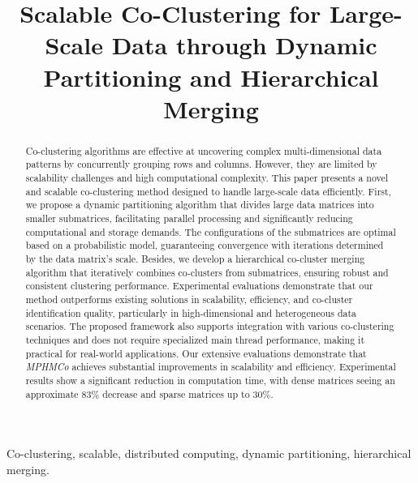 \documentclass[journal]{IEEEtran}
\begin{document}
\title{\LARGE \bf Scalable Co-Clustering for Large-Scale Data through Dynamic Partitioning and Hierarchical Merging}


\author{}
\maketitle

\begin{abstract}
  Co-clustering algorithms are effective at uncovering complex multi-dimensional data patterns by concurrently grouping rows and columns. However, they are limited by scalability challenges and high computational complexity. This paper presents a novel and scalable co-clustering method designed to handle large-scale data efficiently. First, we propose a dynamic partitioning algorithm that divides large data matrices into smaller submatrices, facilitating parallel processing and significantly reducing computational and storage demands. The configurations of the submatrices are optimal based on a probabilistic model, guaranteeing convergence with iterations determined by the data matrix's scale. Besides, we develop a hierarchical co-cluster merging algorithm that iteratively combines co-clusters from submatrices, ensuring robust and consistent clustering performance. Experimental evaluations demonstrate that our method outperforms existing solutions in scalability, efficiency, and co-cluster identification quality, particularly in high-dimensional and heterogeneous data scenarios. The proposed framework also supports integration with various co-clustering techniques and does not require specialized main thread performance, making it practical for real-world applications. Our extensive evaluations demonstrate that \emph{MPHMCo} achieves substantial improvements in scalability and efficiency. Experimental results show a significant reduction in computation time, with dense matrices seeing an approximate 83\% decrease and sparse matrices up to 30\%.
\end{abstract}

\begin{IEEEkeywords}
  Co-clustering, scalable, distributed computing, dynamic partitioning, hierarchical merging.
\end{IEEEkeywords}
\end{document}
